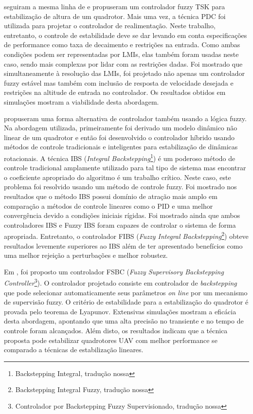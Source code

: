  seguiram a mesma linha de  e propuseram um controlador fuzzy TSK para estabilização de altura de um quadrotor. Mais uma vez, a técnica PDC foi utilizada para projetar o controlador de realimentação. Neste trabalho, entretanto, o controle de estabilidade deve se dar levando em conta especificações de performance como taxa de decaimento e restrições na entrada. Como ambas condições podem ser representadas por LMIs, elas também foram usadas neste caso, sendo mais complexas por lidar com as restrições dadas. Foi mostrado que simultaneamente à resolução das LMIs, foi projetado não apenas um controlador fuzzy estável mas também com inclusão de resposta de velocidade desejada e restrições na altitude de entrada no controlador. Os resultados obtidos em simulações mostram a viabilidade desta abordagem.

\cite{JavidiNiroumand2013} propuseram uma forma alternativa de controlador também usando a lógica fuzzy. Na abordagem utilizada, primeiramente foi derivado um modelo dinâmico não linear de um quadrotor e então foi desenvolvido o controlador híbrido usando métodos de controle tradicionais e inteligentes para estabilização de dinâmicas rotacionais. A técnica IBS (\textit{Integral Backstepping}\footnote{Backstepping Integral, tradução nossa}) é um poderoso método de controle tradicional amplamente utilizado para tal tipo de sistema mas encontrar o coeficiente apropriado do algoritmo é um trabalho crítico. Neste caso, este problema foi resolvido usando um método de controle fuzzy. Foi mostrado nos resultados que o método IBS possui domínio de atração mais amplo em comparação a métodos de controle lineares como o PID e uma melhor convergência devido a condições iniciais rígidas. Foi mostrado ainda que ambos controladores IBS e Fuzzy IBS foram capazes de controlar o sistema de forma apropriada. Entretanto, o controlador FIBS (\textit{Fuzzy Integral Backstepping}\footnote{Backstepping Integral Fuzzy, tradução nossa}) obteve resultados levemente superiores ao IBS além de ter apresentado benefícios como uma melhor rejeição a perturbações e melhor robustez.

Em \cite{Ariffanan2014}, foi proposto um controlador FSBC (\textit{Fuzzy Supervisory Backstepping Controller}\footnote{Controlador por Backstepping Fuzzy Supervisionado, tradução nossa}). O controlador projetado consiste em controlador de \textit{backstepping} que pode selecionar automaticamente seus parâmetros \textit{on line} por um mecanismo de supervisão fuzzy. O critério de estabilidade para a estabilização do quadrotor é provada pelo teorema de Lyapunov. Extensivas simulações mostram a eficácia desta abordagem, apontando que uma alta precisão no transiente e no tempo de controle foram alcançados. Além disto, os resultados indicam que a técnica proposta pode estabilizar quadrotores UAV com melhor performance se comparado a técnicas de estabilização lineares.

